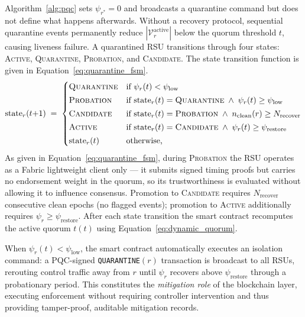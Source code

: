 Algorithm~\ref{alg:pqc} sets $\psi_{r^*}=0$ and broadcasts a
quarantine command but does not define what happens afterwards.
Without a recovery protocol, sequential quarantine events
permanently reduce $|\mathcal{V}_r^{\mathrm{active}}|$ below the
quorum threshold $t$, causing liveness failure. A quarantined RSU
transitions through four states: \textsc{Active},
\textsc{Quarantine}, \textsc{Probation}, and \textsc{Candidate}.
The state transition function is given in
Equation~\eqref{eq:quarantine_fsm}.
%
\begin{equation}
  \mathrm{state}_r(t{+}1) \;=\;
  \begin{cases}
    \textsc{Quarantine} &
      \text{if } \psi_r(t) < \psi_{\mathrm{low}} \\[2pt]
    \textsc{Probation}  &
      \text{if } \mathrm{state}_r(t)=\textsc{Quarantine}
      \;\wedge\; \psi_r(t) \geq \psi_{\mathrm{low}} \\[2pt]
    \textsc{Candidate}  &
      \text{if } \mathrm{state}_r(t)=\textsc{Probation}
      \;\wedge\; n_{\mathrm{clean}}(r) \geq N_{\mathrm{recover}} \\[2pt]
    \textsc{Active}     &
      \text{if } \mathrm{state}_r(t)=\textsc{Candidate}
      \;\wedge\; \psi_r(t) \geq \psi_{\mathrm{restore}} \\[2pt]
    \mathrm{state}_r(t) & \text{otherwise,}
  \end{cases}
  \label{eq:quarantine_fsm}
\end{equation}
%
As given in Equation~\eqref{eq:quarantine_fsm}, during
\textsc{Probation} the RSU operates as a Fabric lightweight client
only --- it submits signed timing proofs but carries no endorsement
weight in the quorum, so its trustworthiness is evaluated without
allowing it to influence consensus. Promotion to \textsc{Candidate}
requires $N_{\mathrm{recover}}$ consecutive clean epochs (no
flagged events); promotion to \textsc{Active} additionally requires
$\psi_r \geq \psi_{\mathrm{restore}}$. After each state transition
the smart contract recomputes the active quorum $t(t)$ using
Equation~\eqref{eq:dynamic_quorum}.


When $\psi_r(t)<\psi_{\mathrm{low}}$, the smart contract
automatically executes an isolation command: a PQC-signed
\texttt{QUARANTINE}$(r)$ transaction is broadcast to all RSUs,
rerouting control traffic away from $r$ until $\psi_r$ recovers
above $\psi_{\mathrm{restore}}$ through a probationary period.
This constitutes the \emph{mitigation role} of the blockchain layer,
executing enforcement without requiring controller intervention and
thus providing tamper-proof, auditable mitigation records.


